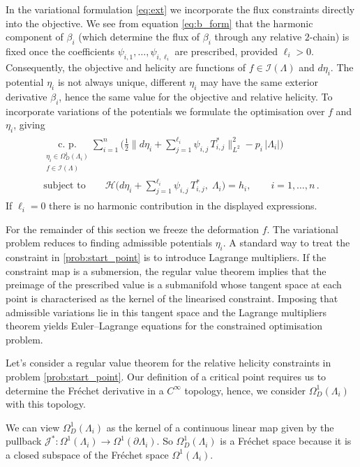 \documentclass[11pt]{article}
\theoremstyle{plain}
\theoremstyle{definition}
\theoremstyle{remark}
\newcommand{\ST}{\Lambda}
\newcommand{\I}{\mathcal{I}(\ST)}
\begin{document}
In the variational formulation \eqref{eq:ext} we incorporate the flux constraints directly into the objective. We see from equation \eqref{eq:b_form} that the harmonic component of \(\beta_i\) (which determine the flux of \(\beta_i\) through any relative \(2\)-chain) is fixed once the coefficients \(\psi_{i,1},\dots,\psi_{i,\ell_i}\) are prescribed, provided \(\ell_i>0\). Consequently, the objective and helicity are functions of \(f\in\I\) and \(d\eta_i\). The potential \(\eta_i\) is not always unique, different \(\eta_i\) may have the same exterior derivative \(\beta_i\), hence the same value for the objective and relative helicity. To incorporate variations of the potentials we formulate the optimisation over \(f\) and \(\eta_i\), giving
\begin{align}\label{prob:start_point}
\begin{gathered}
    \underset{\substack{  \eta_i \in  \Omega^1_D(\ST_i)  \\  f\in\I} }{ \text{c. p.} } \sum_{i=1}^n \Bigg( \frac{1}{2}\Big\| d\eta_i + \sum_{j=1}^{\ell_i} \psi_{i,j}\,T_{i,j}^* \Big\|_{L^2}^2 - p_i\,|\ST_i| \Bigg) \\
  \text{subject to}\qquad 
   \mathscr{H}\!\Big( d\eta_i + \sum_{j=1}^{\ell_i} \psi_{i,j}\,T_{i,j}^* ,\; \ST_i\Big) = h_i,\qquad i=1,\dots,n \, . 
\end{gathered}
\end{align}
If \(\ell_i=0\) there is no harmonic contribution in the displayed expressions.

For the remainder of this section we freeze the deformation \(f\). The variational problem reduces to finding admissible potentials \(\eta_i\). A standard way to treat the constraint in \eqref{prob:start_point} is to introduce Lagrange multipliers. If the constraint map is a submersion, the regular value theorem implies that the preimage of the prescribed value is a submanifold whose tangent space at each point is characterised as the kernel of the linearised constraint. Imposing that admissible variations lie in this tangent space and the Lagrange multipliers theorem yields Euler--Lagrange equations for the constrained optimisation problem.

Let's consider a regular value theorem for the relative helicity constraints in problem \eqref{prob:start_point}. Our definition of a critical point requires us to determine the Fr\'echet derivative in a \(C^\infty\) topology, hence, we consider \(\Omega^1_D(\ST_i)\) with this topology. 


We can view \(\Omega_D^1(\ST_i)\) as the kernel of a continuous linear map given by the pullback \(\mathcal{J}^* : \Omega^1(\ST_i) \to \Omega^1(\partial \ST_i)  \). So \(\Omega_D^1(\ST_i)\) is a Fr\'echet space because it is a closed subspace of the Fr\'echet space \(\Omega^1(\ST_i)\). 
\end{document}
